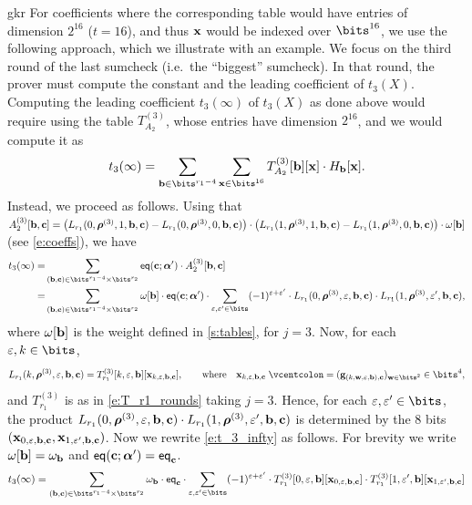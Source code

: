 \begin{lncsappendix}{gkr}
For coefficients where the corresponding table would have entries of dimension $2^{16}$ ($t=16$), and thus $\mathbf{x}$ would be indexed over $\bits^{16}$, we use the following approach, which we illustrate with an example. We focus on  the third round of the last sumcheck (i.e.\ the  ``biggest'' sumcheck). In that round, the prover must compute the constant and the leading coefficient of $t_3(X)$. Computing the leading coefficient $t_3(\infty)$  of $t_3(X)$ as done above  would require using the table $T_{A_2}^{(3)}$, whose entries have dimension $2^{16}$, and we would compute it as 
%
$$
 t_3(\infty)=\sum_{\bb\in \bits^{r_1-4}} \sum_{\xx\in \bits^{16}}  T_{A_2}^{(3)}[\bb][\xx] \cdot H_{\bb}[\xx]. 
$$
Instead, we proceed as follows. Using that $ A_{2}^{(3)}[\mathbf{b},\mathbf{c}] = \big(L_{r_1}(0,\bm{\rho}^{(3)},1,\mathbf{b},\mathbf{c}) - L_{r_1}(0,\bm{\rho}^{(3)},0,\mathbf{b},\mathbf{c})\big)  \cdot \big(L_{r_1}(1,\bm{\rho}^{(3)},1,\mathbf{b},\mathbf{c}) - L_{r_1}(1,\bm{\rho}^{(3)},0,\mathbf{b},\mathbf{c})\big)\cdot \omega[\mathbf{b}]$ (see \cref{e:coeffs}), we have
%
\begin{equation}\label{e:t_3_infty}
\begin{aligned}
t_3(\infty) =& \sum_{(\bb,\cc)\in \bits^{r_1-4}\times \bits^{r_2}}  \eq(\cc;\bm{\alpha}') \cdot A_{2}^{(3)}[\bb,\cc]\\ 
=& \sum_{(\bb,\cc)\in \bits^{r_1-4}\times \bits^{r_2}} \omega[\bb]\cdot \eq(\cc;\bm{\alpha}') \cdot \sum_{\eps,\eps'\in \bits} (-1)^{\eps+\eps'} \cdot L_{r_1}(0,\bm{\rho}^{(3)},\eps,\bb,\cc) \cdot L_{r_1}(1,\bm{\rho}^{(3)},\eps',\bb,\cc), 
\end{aligned}
\end{equation}
where $\omega[\mathbf{b}]$ is the weight defined in \cref{s:tables}, for $j=3$.  Now, for each $\eps,k\in \bits$,
%
$$
L_{r_1}(k, \bm{\rho}^{(3)}, \eps, \bb, \cc) = T_{r_1}^{(3)}[k,\eps,\bb][\xx_{k,\eps,\bb,\cc}], \qquad \text{where} \quad \xx_{k,\eps,\bb,\cc}\defeq (\bfg_{(k,\ww,\eps,\bb),\cc})_{\ww\in\bits^2}\in \bits^4,
$$
%
and $T_{r_1}^{(3)}$ is as in \eqref{e:T_r1_rounds} taking $j=3$. Hence, for each $\eps,\eps'\in \bits$, the product $L_{r_1}(0,\bm{\rho}^{(3)},\varepsilon,\mathbf{b},\mathbf{c})\cdot L_{r_1}(1,\bm{\rho}^{(3)},\varepsilon',\mathbf{b},\mathbf{c})$ is determined by the $8$ bits $(\mathbf{x}_{0,\varepsilon,\mathbf{b}, \mathbf{c}}, \mathbf{x}_{1,\varepsilon',\mathbf{b},\mathbf{c}})$.
%
Now we rewrite \eqref{e:t_3_infty}  as follows. For brevity we write $\omega[\mathbf{b}] = \omega_{\mathbf{b}}$ and $ \mathsf{eq}(\mathbf{c}; \bm{\alpha}') = \mathsf{eq}_{\mathbf{c}}$. 
%
\begin{align*}
 t_3(\infty)&= \sum_{(\bb,\cc)\in \bits^{r_1-4}\times \bits^{r_2}} \omega_\bb\cdot \eq_{\cc}\cdot \sum_{\eps,\eps'\in \bits} (-1)^{\eps+\eps'}\cdot T_{r_1}^{(3)}[0,\eps,\bb][\xx_{0,\eps,\bb,\cc}] \cdot T_{r_1}^{(3)}[1,\eps',\bb][\xx_{1,\eps',\bb,\cc}]\\ 

\end{align*}
\end{lncsappendix}
